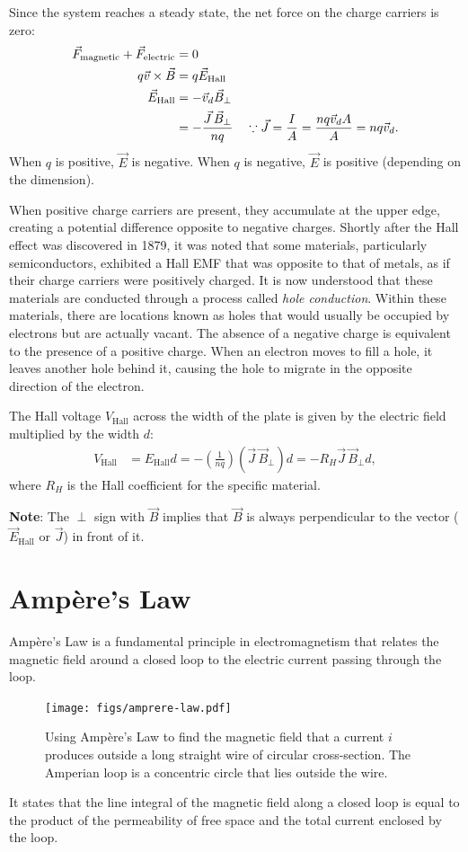\documentclass[12pt,b4paper]{article}
\begin{document}
Since the system reaches a steady state, the net force on the charge carriers is zero:
\begin{align}
    \vec{F}_\text{magnetic}+\vec{F}_\text{electric}&=0\notag\\
    q\vec{v}\times\vec{B}&=q\vec{E}_\text{Hall}\notag\\
    \vec{E}_\text{Hall}&=-\vec{v}_d\vec{B}_\perp\notag\\
    &=-\frac{\vec{J}\,\vec{B}_\perp}{nq}\quad \because \vec{J}=\frac{I}{A}=\frac{nq\vec{v}_dA}{A}=nq\vec{v}_d.
\end{align}
When $q$ is positive, $\vec{E}$ is negative. When $q$ is negative, $\vec{E}$ is positive (depending on the dimension). 

When positive charge carriers are present, they accumulate at the upper edge, creating a potential difference opposite to negative charges. Shortly after the Hall effect was discovered in 1879, it was noted that some materials, particularly semiconductors, exhibited a Hall EMF that was opposite to that of metals, as if their charge carriers were positively charged. It is now understood that these materials are conducted through a process called \textit{hole conduction}. Within these materials, there are locations known as holes that would usually be occupied by electrons but are actually vacant. The absence of a negative charge is equivalent to the presence of a positive charge. When an electron moves to fill a hole, it leaves another hole behind it, causing the hole to migrate in the opposite direction of the electron. 

The Hall voltage $V_\text{Hall}$ across the width of the plate is given by the electric field multiplied by the width $d$:
\begin{align}
    V_\text{Hall}&=E_\text{Hall}d=-\left(\frac{1}{nq}\right)(\vec{J}\,\vec{B}_\perp)d=-R_H\vec{J}\,\vec{B}_\perp d,
\end{align}
where $R_H$ is the Hall coefficient for the specific material.

\textbf{Note}: The $\perp$ sign with $\vec{B}$ implies that $\vec{B}$ is always perpendicular to the vector ($\vec{E}_\text{Hall}$ or $\vec{J}$) in front of it.
\section{Ampère's Law}
Ampère's Law is a fundamental principle in electromagnetism that relates the magnetic field around a closed loop to the electric current passing through the loop. 
\begin{figure}[H]
    \centering
    \texttt{[image: figs/amprere-law.pdf]}
    \caption{Using Ampère’s Law to find the magnetic field that a current $i$ produces outside a long straight wire of circular cross-section. The Amperian loop is a concentric circle that lies outside the wire.}
    \label{fig:ampere-law}
\end{figure}
It states that the line integral of the magnetic field along a closed loop is equal to the product of the permeability of free space and the total current enclosed by the loop.
\end{document}
